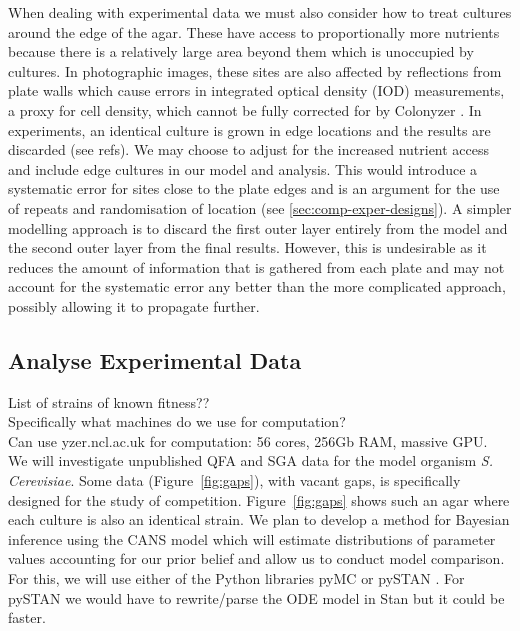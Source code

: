 When dealing with experimental data we must also consider how to treat
cultures around the edge of the agar. These have access to
proportionally more nutrients because there is a relatively large area
beyond them which is unoccupied by cultures. In photographic images,
these sites are also affected by reflections from plate walls which
cause errors in integrated optical density (IOD) measurements, a proxy
for cell density, which cannot be fully corrected for by Colonyzer
\citep{Lawless2010}. In experiments, an identical culture is grown in
edge locations and the results are discarded (see refs). We may choose
to adjust for the increased nutrient access and include edge cultures
in our model and analysis. This would introduce a systematic error for
sites close to the plate edges and is an argument for the use of
repeats and randomisation of location (see
\ref{sec:comp-exper-designs}). A simpler modelling approach is to
discard the first outer layer entirely from the model and the second
outer layer from the final results. However, this is undesirable as it
reduces the amount of information that is gathered from each plate and
may not account for the systematic error any better than the more
complicated approach, possibly allowing it to propagate further.

\subsection{Analyse Experimental Data}
\label{sec:analyse-data}

List of strains of known fitness??\\
Specifically what machines do we use for computation?\\
Can use yzer.ncl.ac.uk for computation: 56 cores, 256Gb RAM, massive GPU.\\

We will investigate unpublished QFA and SGA data for the model
organism \textit{S. Cerevisiae}. Some data (Figure~\ref{fig:gaps}),
with vacant gaps, is specifically designed for the study of
competition. Figure~\ref{fig:gaps} shows such an agar where each
culture is also an identical strain. We plan to develop a method for
Bayesian inference using the CANS model which will estimate
distributions of parameter values accounting for our prior belief and
allow us to conduct model comparison. For this, we will use either of
the Python libraries pyMC \citep{PyMC2010} or pySTAN \citep{Stan}. For
pySTAN we would have to rewrite/parse the ODE model in Stan but it
could be faster.

